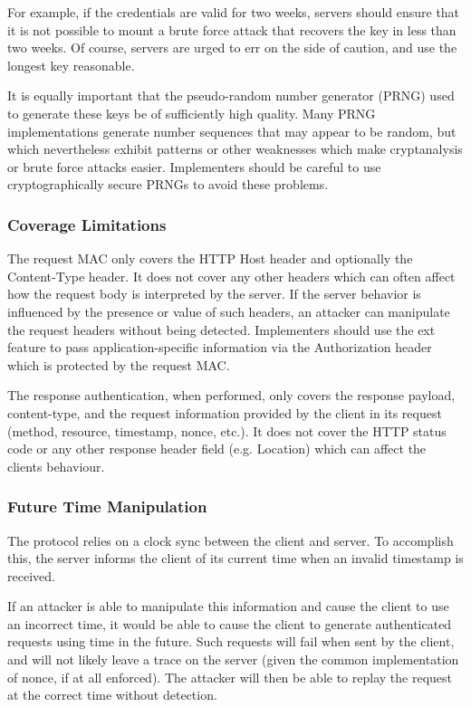For example, if the credentials are valid for two weeks, servers should ensure that it is not possible to mount a brute force attack that recovers the key in less than two weeks. Of course, servers are urged to err on the side of caution, and use the longest key reasonable.

It is equally important that the pseudo-\/random number generator (P\+R\+NG) used to generate these keys be of sufficiently high quality. Many P\+R\+NG implementations generate number sequences that may appear to be random, but which nevertheless exhibit patterns or other weaknesses which make cryptanalysis or brute force attacks easier. Implementers should be careful to use cryptographically secure P\+R\+N\+Gs to avoid these problems.

\subsubsection*{Coverage Limitations}

The request M\+AC only covers the H\+T\+TP {\ttfamily Host} header and optionally the {\ttfamily Content-\/\+Type} header. It does not cover any other headers which can often affect how the request body is interpreted by the server. If the server behavior is influenced by the presence or value of such headers, an attacker can manipulate the request headers without being detected. Implementers should use the {\ttfamily ext} feature to pass application-\/specific information via the {\ttfamily Authorization} header which is protected by the request M\+AC.

The response authentication, when performed, only covers the response payload, content-\/type, and the request information provided by the client in it\textquotesingle{}s request (method, resource, timestamp, nonce, etc.). It does not cover the H\+T\+TP status code or any other response header field (e.\+g. Location) which can affect the client\textquotesingle{}s behaviour.

\subsubsection*{Future Time Manipulation}

The protocol relies on a clock sync between the client and server. To accomplish this, the server informs the client of its current time when an invalid timestamp is received.

If an attacker is able to manipulate this information and cause the client to use an incorrect time, it would be able to cause the client to generate authenticated requests using time in the future. Such requests will fail when sent by the client, and will not likely leave a trace on the server (given the common implementation of nonce, if at all enforced). The attacker will then be able to replay the request at the correct time without detection.

